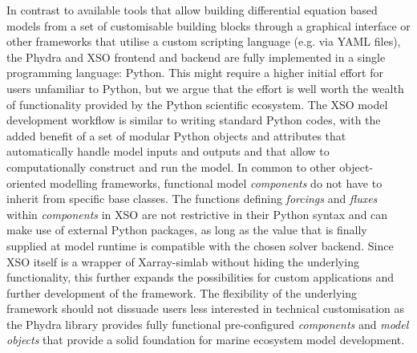 \documentclass[journal abbreviation, manuscript]{copernicus}
\begin{document}
In contrast to available tools that allow building differential equation based models from a set of customisable building blocks through a graphical interface or other frameworks that utilise a custom scripting language (e.g. via YAML files), the Phydra and XSO frontend and backend are fully implemented in a single programming language: Python. This might require a higher initial effort for users unfamiliar to Python, but we argue that the effort is well worth the wealth of functionality provided by the Python scientific ecosystem. The XSO model development workflow is similar to writing standard Python codes, with the added benefit of a set of modular Python objects and attributes that automatically handle model inputs and outputs and that allow to computationally construct and run the model. In common to other object-oriented modelling frameworks, functional model \textit{components} do not have to inherit from specific base classes. The functions defining \textit{forcings} and \textit{fluxes} within \textit{components} in XSO are not restrictive in their Python syntax and can make use of external Python packages, as long as the value that is finally supplied at model runtime is compatible with the chosen solver backend. Since XSO itself is a wrapper of Xarray-simlab without hiding the underlying functionality, this further expands the possibilities for custom applications and further development of the framework. The flexibility of the underlying framework should not dissuade users less interested in technical customisation as the Phydra library provides fully functional pre-configured \textit{components} and \textit{model objects} that provide a solid foundation for marine ecosystem model development.
\end{document}
